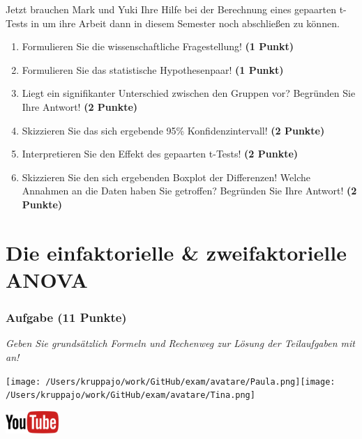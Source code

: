 \documentclass[a4paper, 9pt]{scrartcl}\usepackage[]{graphicx}\usepackage[]{xcolor}
\begin{document}
Jetzt brauchen Mark und Yuki Ihre Hilfe bei der Berechnung eines gepaarten t-Tests in \Rlogo um ihre Arbeit dann in diesem Semester noch abschließen zu können.

\begin{enumerate}
  \item Formulieren Sie die wissenschaftliche Fragestellung! \textbf{(1 Punkt)}
  \item Formulieren Sie das statistische Hypothesenpaar! \textbf{(1 Punkt)}
\item Liegt ein signifikanter Unterschied zwischen den Gruppen vor?
  Begründen Sie Ihre Antwort! \textbf{(2 Punkte)}
\item Skizzieren Sie das sich ergebende 95\% Konfidenzintervall! \textbf{(2 Punkte)}
\item Interpretieren Sie den Effekt des gepaarten t-Tests! \textbf{(2 Punkte)}
\item Skizzieren Sie den sich ergebenden Boxplot der Differenzen! Welche Annahmen an die Daten haben Sie getroffen? Begründen Sie Ihre Antwort! \textbf{(2 Punkte)} 
\end{enumerate}
 
\clearpage
\part{Die einfaktorielle \& zweifaktorielle ANOVA}

\section{Aufgabe \hfill (11 Punkte)}

\textit{Geben Sie grundsätzlich Formeln und Rechenweg zur Lösung der Teilaufgaben mit an!} \\[1Ex]
 

 
\begin{minipage}[t]{0.5\textwidth}
\texttt{[image: /Users/kruppajo/work/GitHub/exam/avatare/Paula.png]}\hspace{-4mm}\texttt{[image: /Users/kruppajo/work/GitHub/exam/avatare/Tina.png]}
\end{minipage}
\begin{minipage}[t]{0.5\textwidth}
\hfill
\href{https://youtu.be/kHmfEmU6lrk}{\includegraphics[width = 2cm]{img/youtube}}
\end{minipage}
\vspace{1ex}
\end{document}
